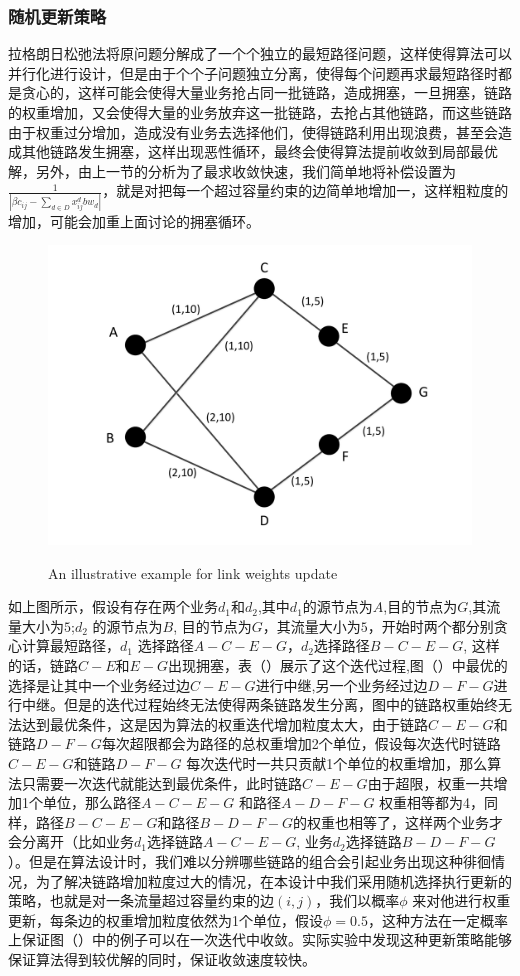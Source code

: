 \subsubsection{随机更新策略}
  拉格朗日松弛法将原问题分解成了一个个独立的最短路径问题，这样使得算法可以并行化进行设计，但是由于个个子问题独立分离，使得每个问题再求最短路径时都是贪心的，这样可能会使得大量业务抢占同一批链路，造成拥塞，一旦拥塞，链路的权重增加，又会使得大量的业务放弃这一批链路，去抢占其他链路，而这些链路由于权重过分增加，造成没有业务去选择他们，使得链路利用出现浪费，甚至会造成其他链路发生拥塞，这样出现恶性循环，最终会使得算法提前收敛到局部最优解，另外，由上一节的分析为了最求收敛快速，我们简单地将补偿设置为$\frac{1}{|\beta c_{ij}-\sum\limits_{d \in D} x_{ij}^d bw_d|}$，就是对把每一个超过容量约束的边简单地增加一，这样粗粒度的增加，可能会加重上面讨论的拥塞循环。
\begin{figure}
\setlength{\belowcaptionskip}{-0.1cm}
  \begin{center}
    {\includegraphics[width=0.4 \textwidth]{figures/random.pdf}}
    \end{center}
  \caption{{\footnotesize{An illustrative example for link weights update}}}
  \label{IterNum}
\end{figure}
  如上图所示，假设有存在两个业务$d_1$和$d_2$,其中$d_1$的源节点为$A$,目的节点为$G$,其流量大小为$5$;$d_2$ 的源节点为$B$, 目的节点为$G$，其流量大小为$5$，开始时两个都分别贪心计算最短路径，$d_1$ 选择路径$A-C-E-G$，$d_2$选择路径$B-C-E-G$, 这样的话，链路$C-E$和$E-G$出现拥塞，表（）展示了这个迭代过程,图（）中最优的选择是让其中一个业务经过边$C-E-G$进行中继,另一个业务经过边$D-F-G$进行中继。但是的迭代过程始终无法使得两条链路发生分离，图中的链路权重始终无法达到最优条件，这是因为算法的权重迭代增加粒度太大，由于链路$C-E-G$和链路$D-F-G$每次超限都会为路径的总权重增加2个单位，假设每次迭代时链路$C-E-G$和链路$D-F-G$ 每次迭代时一共只贡献1个单位的权重增加，那么算法只需要一次迭代就能达到最优条件，此时链路$C-E-G$由于超限，权重一共增加1个单位，那么路径$A-C-E-G$ 和路径$A-D-F-G$ 权重相等都为4，同样，路径$B-C-E-G$和路径$B-D-F-G$的权重也相等了，这样两个业务才会分离开（比如业务$d_1$选择链路$A-C-E-G$, 业务$d_2$选择链路$B-D-F-G$）。但是在算法设计时，我们难以分辨哪些链路的组合会引起业务出现这种徘徊情况，为了解决链路增加粒度过大的情况，在本设计中我们采用随机选择执行更新的策略，也就是对一条流量超过容量约束的边$(i,j)$，我们以概率$\phi$ 来对他进行权重更新，每条边的权重增加粒度依然为1个单位，假设$\phi=0.5$，这种方法在一定概率上保证图（）中的例子可以在一次迭代中收敛。实际实验中发现这种更新策略能够保证算法得到较优解的同时，保证收敛速度较快。
